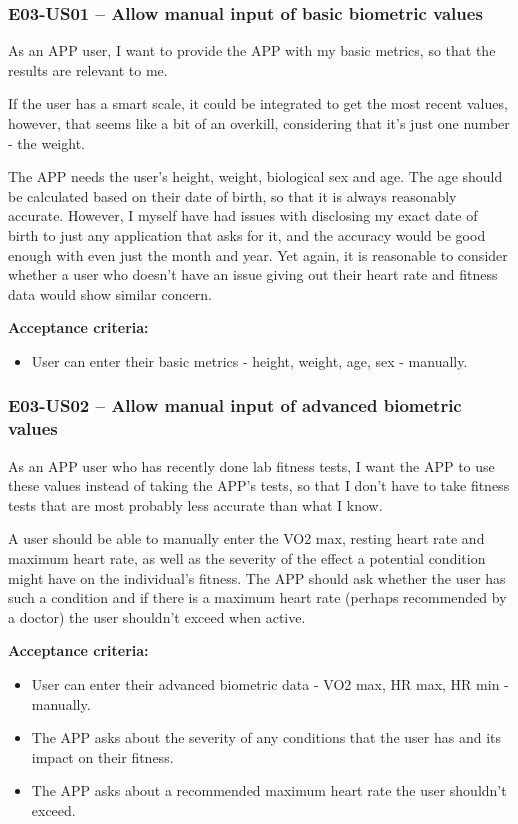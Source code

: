 \subsubsection*{E03-US01 -- Allow manual input of basic biometric values}
As an APP user, I want to provide the APP with my basic metrics, so that the results are relevant to me.

If the user has a smart scale, it could be integrated to get the most recent values, however, that seems like a bit of an overkill, considering that it's just one number - the weight.

The APP needs the user's height, weight, biological sex and age.
The age should be calculated based on their date of birth, so that it is always reasonably accurate.
However, I myself have had issues with disclosing my exact date of birth to just any application that asks for it, and the accuracy would be good enough with even just the month and year.
Yet again, it is reasonable to consider whether a user who doesn't have an issue giving out their heart rate and fitness data would show similar concern.

\textbf{Acceptance criteria:}
\begin{itemize}
    \item User can enter their basic metrics - height, weight, age, sex - manually.
\end{itemize}

\subsubsection*{E03-US02 -- Allow manual input of advanced biometric values}
As an APP user who has recently done lab fitness tests, I want the APP to use these values instead of taking the APP's tests, so that I don't have to take fitness tests that are most probably less accurate than what I know.

A user should be able to manually enter the VO2 max, resting heart rate and maximum heart rate, as well as the severity of the effect a potential condition might have on the individual's fitness.
The APP should ask whether the user has such a condition and if there is a maximum heart rate (perhaps recommended by a doctor) the user shouldn't exceed when active.

\textbf{Acceptance criteria:}
\begin{itemize}
    \item User can enter their advanced biometric data - VO2 max, HR max, HR min - manually.
    \item The APP asks about the severity of any conditions that the user has and its impact on their fitness.
    \item The APP asks about a recommended maximum heart rate the user shouldn't exceed.
\end{itemize}

